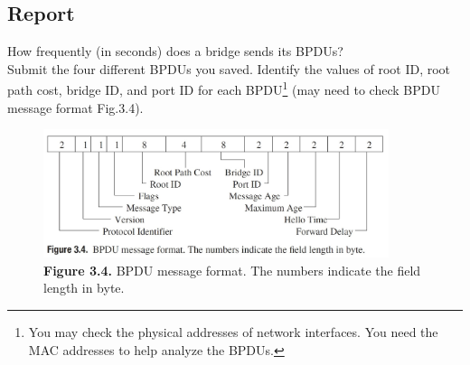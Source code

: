 \documentclass[10pt,a4paper]{article}
\numberwithin{equation}{section}
\numberwithin{figure}{section}
\numberwithin{table}{section}
\begin{document}
    \subsection*{Report}
    How frequently (in seconds) does a bridge sends its BPDUs? \\
    Submit the four different BPDUs you saved.
    Identify the values of root ID, root path cost, bridge ID, and port ID for each BPDU\footnote{You may check the physical addresses of network interfaces. You need the MAC addresses to help analyze the BPDUs.} (may need to check BPDU message format Fig.3.4).

    \begin{figure}[H]
        \centering
        \includegraphics[width=0.9\textwidth]{img/figure3-4.jpg}
        \caption{\textbf{Figure 3.4.} BPDU message format. The numbers indicate the field length in byte.}
    \end{figure}
\end{document}
